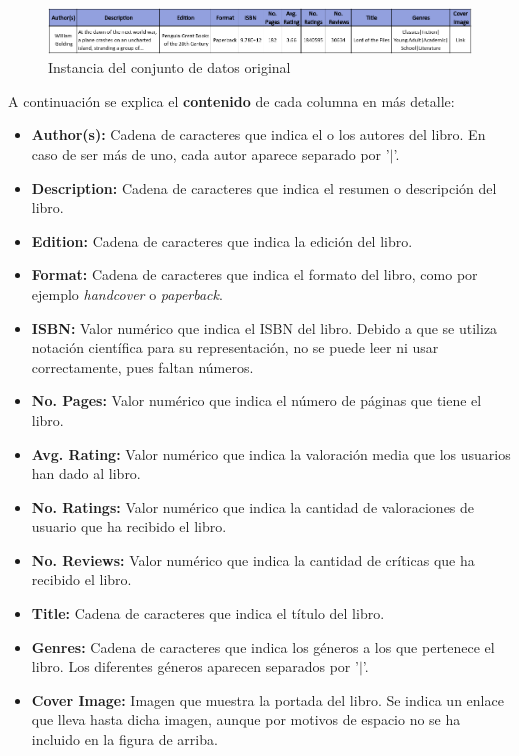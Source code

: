 \documentclass[12pt,a4paper, xcolor=table]{article}
\begin{document}
    \vspace{3mm}

    \begin{figure}[!h]
        \centering
        \includegraphics[width=500px]{img/instancia_dataset_original.png}
        \caption{Instancia del conjunto de datos original}
        \label{fig:original}

    \end{figure}

    \vspace{3mm}

    A continuación se explica el \textbf{contenido} de cada columna en más detalle:

    \begin{itemize}
        \item \textbf{Author(s):} Cadena de caracteres que indica el o los autores del libro. En caso de ser más de uno, cada autor aparece separado por '$\mid$'.
        \item \textbf{Description:} Cadena de caracteres que indica el resumen o descripción del libro.
        \item \textbf{Edition:} Cadena de caracteres que indica la edición del libro.
        \item \textbf{Format:} Cadena de caracteres que indica el formato del libro, como por ejemplo \textit{handcover} o \textit{paperback}.
        \item \textbf{ISBN:} Valor numérico que indica el ISBN del libro. Debido a que se utiliza notación científica para su representación, no se puede leer ni usar correctamente, pues faltan números.
        \item \textbf{No. Pages:} Valor numérico que indica el número de páginas que tiene el libro.
        \item \textbf{Avg. Rating:} Valor numérico que indica la valoración media que los usuarios han dado al libro.
        \item \textbf{No. Ratings:}  Valor numérico que indica la cantidad de valoraciones de usuario que ha recibido el libro.
        \item \textbf{No. Reviews:} Valor numérico que indica la cantidad de críticas que ha recibido el libro.
        \item \textbf{Title:} Cadena de caracteres que indica el título del libro.
        \item \textbf{Genres:} Cadena de caracteres que indica los géneros a los que pertenece el libro. Los diferentes géneros aparecen separados por '$\mid$'.
        \item \textbf{Cover Image:} Imagen que muestra la portada del libro. Se indica un enlace que lleva hasta dicha imagen, aunque por motivos de espacio no se ha incluido en la figura de arriba.
    \end{itemize}
\end{document}
